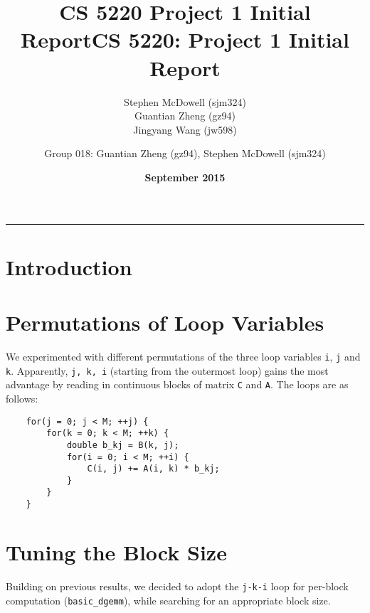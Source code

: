 \documentclass[11pt]{article}
\title{\textbf{CS 5220 Project 1 Initial Report}}
\author{Stephen McDowell (sjm324)\\ Guantian Zheng (gz94)\\ Jingyang Wang (jw598)}
\date{\textbf{September 2015}}
\title{CS 5220: Project 1 Initial Report}
\author{Group 018: Guantian Zheng (gz94), Stephen McDowell (sjm324)}
\makeatletter
\renewcommand{\maketitle}{\bgroup\setlength{\parindent}{0pt}
\begin{flushleft}
  {\Large \textsc{\@title}}\newline
  \textsc{\@author}
  \rule{\textwidth}{1pt}
\end{flushleft}\egroup
}
\makeatother
\begin{document}
\thispagestyle{empty}
\maketitle

\section{Introduction}

\section{Permutations of Loop Variables}

%


We experimented with different permutations of the three loop variables \texttt{i}, \texttt{j} and \texttt{k}. Apparently, \texttt{j, k, i} (starting from the outermost loop) gains the most advantage by reading in continuous blocks of matrix \texttt{C} and \texttt{A}. The loops are as follows:

\begin{lstlisting}
    for(j = 0; j < M; ++j) {
        for(k = 0; k < M; ++k) {
            double b_kj = B(k, j);
            for(i = 0; i < M; ++i) {
                C(i, j) += A(i, k) * b_kj;
            }
        }
    }
\end{lstlisting}

\section{Tuning the Block Size}

Building on previous results, we decided to adopt the \texttt{j-k-i} loop for per-block computation (\texttt{basic\_dgemm}), while searching for an appropriate block size. 

\end{document}
